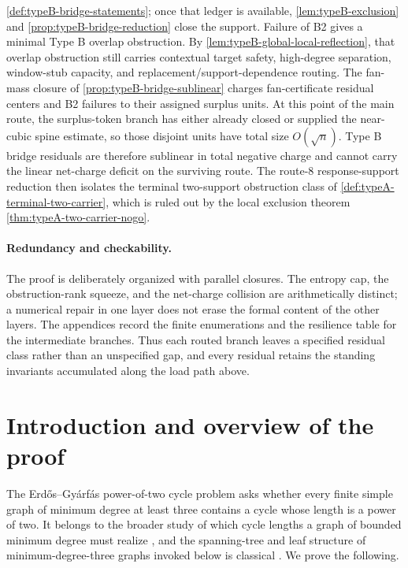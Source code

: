 \documentclass[11pt]{article}
\begin{document}
\cref{def:typeB-bridge-statements}; once that ledger is available,
\cref{lem:typeB-exclusion} and \cref{prop:typeB-bridge-reduction} close the
support.  Failure of B2 gives a minimal Type B overlap obstruction.  By
\cref{lem:typeB-global-local-reflection}, that overlap obstruction still carries
contextual target safety, high-degree separation, window-stub capacity, and
replacement/support-dependence routing.  The fan-mass closure of
\cref{prop:typeB-bridge-sublinear} charges fan-certificate residual centers and
B2 failures to their assigned surplus units.  At this point of the main route,
the surplus-token branch has either already closed or supplied the near-cubic
spine estimate, so those disjoint units have total size \(O(\sqrt n)\).  Type B
bridge residuals are therefore sublinear in total negative charge and cannot
carry the linear net-charge deficit on the surviving route.  The route-8 response-support
reduction then isolates the terminal two-support obstruction class of
\cref{def:typeA-terminal-two-carrier}, which is ruled out by the local exclusion
theorem \cref{thm:typeA-two-carrier-nogo}.

\paragraph{Redundancy and checkability.}
The proof is deliberately organized with parallel closures.  The entropy cap,
the obstruction-rank squeeze, and the net-charge collision are arithmetically
distinct; a numerical repair in one layer does not erase the formal content of
the other layers.  The appendices record the finite enumerations and the
resilience table for the intermediate branches.  Thus each routed branch leaves
a specified residual class rather than an unspecified gap, and every residual
retains the standing invariants accumulated along the load path above.


\section{Introduction and overview of the proof}\label{sec:intro}

The Erd\H{o}s--Gy\'arf\'as power-of-two cycle problem asks whether every finite simple graph of minimum degree at least three contains a cycle whose length is a power of two.  It belongs to the broader study of which cycle lengths a graph of bounded minimum degree must realize \cite{BondyVince,GaoMa}, and the spanning-tree and leaf structure of minimum-degree-three graphs invoked below is classical \cite{KleitmanWest}.  We prove the following.
\end{document}
